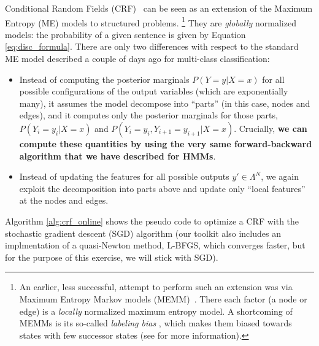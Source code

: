 Conditional Random Fields (CRF)~\citep{lafferty2001conditional} can be seen
as an extension of the Maximum Entropy (ME) models  to structured problems.%
\footnote{An earlier, less successful, attempt to perform such an extension was via Maximum Entropy Markov
models (MEMM)~\citep{mccallum2000maximum}. There each factor (a node or edge) 
is a \emph{locally} normalized maximum entropy model. A shortcoming of MEMMs is its 
so-called \emph{labeling bias} \citep{Bottou1991}, which makes them biased towards states
with few successor states (see \cite{lafferty2001conditional} for more information).}
They are \emph{globally} normalized models: the probability of a given
sentence is given by Equation \ref{eq:disc_formula}. 
There are only two differences with respect to the standard ME model 
described a couple of days ago for multi-class classification: 
\begin{itemize}
\item Instead of computing the posterior marginals $P(Y=y|X=x)$ for all possible configurations
of the output variables (which are exponentially many), it 
assumes the model decompose into ``parts'' (in this case, nodes and edges), and it computes only 
the posterior marginals for those parts, 
  $P(Y_i=y_i | X=x)$ and  $P(Y_i=y_i, Y_{i+1}=y_{i+1}| X=x)$. 
Crucially, \textbf{we can compute these quantities by using the very same forward-backward algorithm that we have described for HMMs}.
\item Instead of updating the features for all possible outputs $y' \in \Lambda^N$, 
we again exploit the decomposition into parts above and update only 
``local features'' at the nodes and edges.
\end{itemize}

Algorithm
\ref{alg:crf_online} shows the pseudo code to optimize a CRF with 
the stochastic gradient descent (SGD) algorithm  
(our toolkit also includes an implmentation of a quasi-Newton method, L-BFGS, 
which converges faster, but for the purpose of this exercise, we will 
stick with SGD). 

